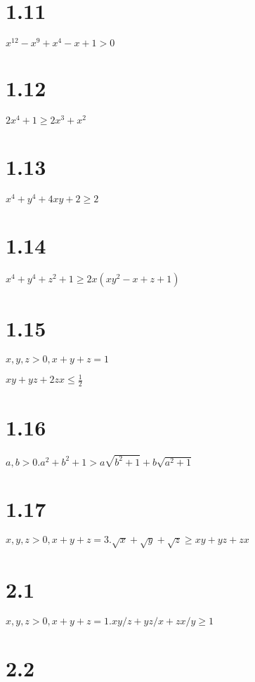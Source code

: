 \documentclass{article}
\begin{document}
\section*{1.11}

$x^12 - x^9 + x^4 - x + 1 > 0$

\section*{1.12}

$2x^4 + 1 \ge 2x^3 + x^2$

\section*{1.13}

$x^4 + y^4 + 4xy + 2 \ge 2$

\section*{1.14}

$x^4 + y^4 + z^2 + 1 \ge 2x(xy^2 - x + z + 1)$

\section*{1.15}

$x, y, z > 0, x + y + z = 1$

$xy + yz + 2zx \le \frac{1}{2}$

\section*{1.16}

$a, b > 0. a^2 + b^2 + 1 > a\sqrt{b^2 + 1} + b\sqrt{a^2 + 1}$

\section*{1.17}

$x, y, z > 0, x + y + z = 3. \sqrt{x} + \sqrt{y} + \sqrt{z} \ge xy + yz + zx$

\section*{2.1}

$x, y, z > 0, x + y + z = 1. xy/z + yz/x + zx/y \ge 1$

\section*{2.2}
\end{document}
